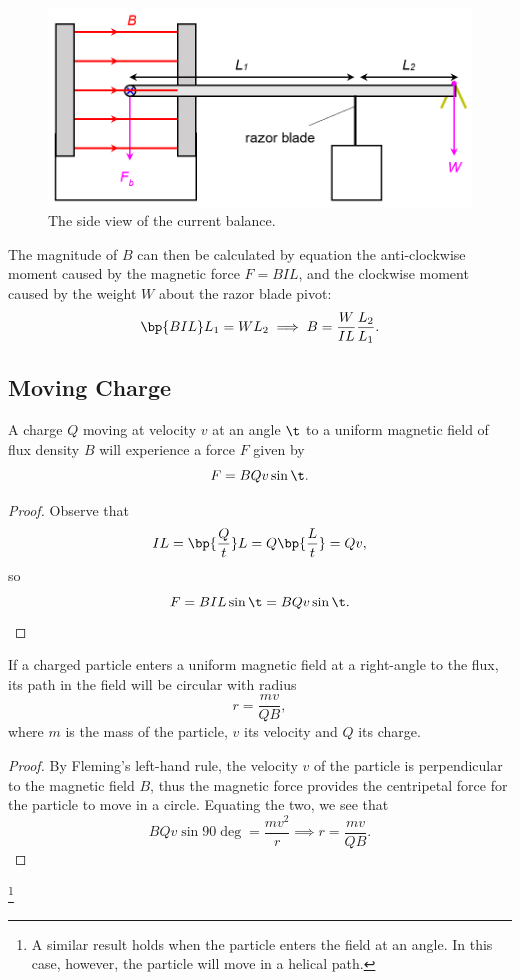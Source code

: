 \begin{figure}[H]
    \centering
    \includegraphics[scale=0.7]{media/Current Balance - Side View.png}
    \caption{The side view of the current balance.\protect\footnotemark[3]}
\end{figure}

The magnitude of $B$ can then be calculated by equation the anti-clockwise moment caused by the magnetic force $F = BIL$, and the clockwise moment caused by the weight $W$ about the razor blade pivot: \[\bp{BIL} L_1 = W L_2 \implies B = \frac{W}{IL} \frac{L_2}{L_1}.\]

\subsection{Moving Charge}

\begin{proposition}
    A charge $Q$ moving at velocity $v$ at an angle $\t$ to a uniform magnetic field of flux density $B$ will experience a force $F$ given by \[F = BQv\sin\t.\]
\end{proposition}
\begin{proof}
    Observe that \[IL = \bp{\frac{Q}{t}} L = Q \bp{\frac{L}{t}} = Qv,\] so \[F = BIL\sin\t = BQv\sin\t.\]
\end{proof}

\begin{proposition}
    If a charged particle enters a uniform magnetic field at a right-angle to the flux, its path in the field will be circular with radius \[r = \frac{mv}{QB},\] where $m$ is the mass of the particle, $v$ its velocity and $Q$ its charge.\protect\footnotemark
\end{proposition}
\begin{proof}
    By Fleming's left-hand rule, the velocity $v$ of the particle is perpendicular to the magnetic field $B$, thus the magnetic force provides the centripetal force for the particle to move in a circle. Equating the two, we see that \[BQv\sin90\deg = \frac{mv^2}{r} \implies r = \frac{mv}{QB}.\]
\end{proof}
\footnote{A similar result holds when the particle enters the field at an angle. In this case, however, the particle will move in a helical path.}


